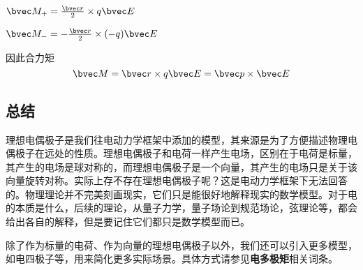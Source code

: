 $\bvec M_+= \frac{\bvec r}{2} \times q\bvec E$

$\bvec M_-= - \frac{\bvec r}{2} \times (-q)\bvec E$

因此合力矩 
\begin{equation}
\bvec M = \bvec r \times q \bvec E = \bvec p \times \bvec E
\end{equation}

\subsection{总结}

理想电偶极子是我们往电动力学框架中添加的模型，其来源是为了方便描述物理电偶极子在远处的性质。理想电偶极子和电荷一样产生电场，区别在于电荷是标量，其产生的电场是球对称的，而理想电偶极子是一个向量，其产生的电场只是关于该向量旋转对称。实际上存不存在理想电偶极子呢？这是电动力学框架下无法回答的。物理理论并不完美刻画现实，它们只是能很好地解释现实的数学模型。对于电的本质是什么，后续的理论，从量子力学，量子场论到规范场论，弦理论等，都会给出各自的解释，但是要记住它们都只是数学模型而已。

除了作为标量的电荷、作为向量的理想电偶极子以外，我们还可以引入更多模型，如电四极子等，用来简化更多实际场景。具体方式请参见\textbf{电多极矩}相关词条。

